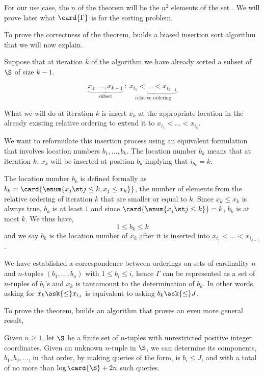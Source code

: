For our use case, the $n$ of the theorem will be the $n^2$ elements of the set
\XY. We will prove later what $\card{\Gamma}$ is for the sorting \XY problem.

To prove the correctness of the theorem, \citet{fredman:1976} builds a biased
insertion sort algorithm that we will now explain.

Suppose that at iteration \(k\) of the algorithm we have already sorted a
subset of \(\S\) of size \(k-1\).

\begin{displaymath}
\underbrace{x_1, \ldots, x_{k-1}}_{\text{subset}}~:~\underbrace{x_{i_1} <
\ldots < x_{i_{k-1}}}_{\text{relative ordering}}
\end{displaymath}

What we will do at iteration $k$ is insert $x_k$ at the appropriate location
in the already existing relative ordering to extend it to $x_{i_1} < \ldots <
x_{i_k}$.

We want to reformulate this insertion process using an equivalent formulation
that involves location numbers $b_1, \ldots, b_k$. The location
number $b_k$ means that at iteration $k$, $x_k$ will be inserted at position
$b_k$ implying that $i_{b_k} = k$.

The location number $b_k$ is defined formally as $b_k = \card{\enum{x_j \st j
\le k, x_j \le x_k}}$, \ie the number of elements from the relative ordering
of iteration $k$ that are smaller or equal to $k$. Since $x_k \le x_k$ is
always true, $b_k$ is at least $1$ and since $\card{\enum{x_j \st j \le k}} =
k$, $b_k$ is at most $k$. We thus have,
$$ 1 \le b_k \le k$$
and we say $b_k$ is the location number of $x_k$ after it is inserted into
$x_{i_1} < \ldots < x_{i_{k-1}}$.

We have established a correspondence between orderings on sets of cardinality
$n$ and $n$-tuples $(b_1, \ldots, b_n)$ with $1 \le b_i \le i$, hence $\Gamma$
can be represented as a set of $n$-tuples of $b_i$'s and $x_k$ is tantamount to
the determination of $b_k$. In other words, asking for $x_k \ask{\le} x_{i_J}$
is equivalent to asking $b_k \ask{\le} J$.

To prove the theorem, \citet{fredman:1976} builds an algorithm that proves an
even more general result,

\begin{lemma}
Given $n \ge 1$, let $\S$ be a finite set of $n$-tuples with unrestricted
positive integer coordinates. Given an unknown $n$-tuple in $\S$, we can
determine its components, $b_1, b_2, \ldots$, in that order, by making queries
of the form, is $b_i \le J$, and with a total of no more than $\log \card{\S}
+ 2n$ such queries.
\end{lemma}

